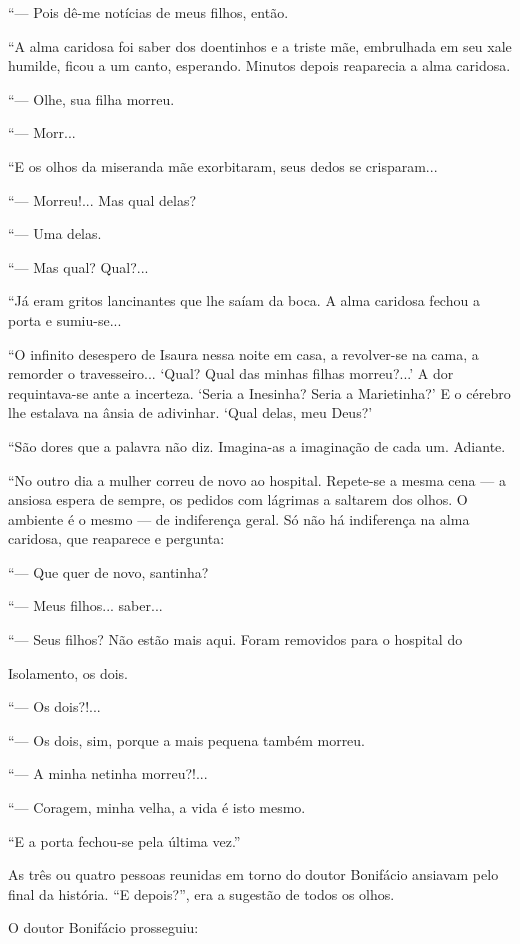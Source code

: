 ``--- Pois dê-me notícias de meus filhos, então.

``A alma caridosa foi saber dos doentinhos e a triste mãe, embrulhada em
seu xale humilde, ficou a um canto, esperando. Minutos depois reaparecia
a alma caridosa.

``--- Olhe, sua filha morreu.

``--- Morr...

``E os olhos da miseranda mãe exorbitaram, seus dedos se crisparam...

``--- Morreu!... Mas qual delas?

``--- Uma delas.

``--- Mas qual? Qual?...

``Já eram gritos lancinantes que lhe saíam da boca. A alma caridosa
fechou a porta e sumiu-se...

``O infinito desespero de Isaura nessa noite em casa, a revolver-se na
cama, a remorder o travesseiro... `Qual? Qual das minhas filhas
morreu?...' A dor requintava-se ante a incerteza. `Seria a Inesinha?
Seria a Marietinha?' E o cérebro lhe estalava na ânsia de adivinhar.
`Qual delas, meu Deus?'

``São dores que a palavra não diz. Imagina-as a imaginação de cada um.
Adiante.

``No outro dia a mulher correu de novo ao hospital. Repete-se a mesma
cena --- a ansiosa espera de sempre, os pedidos com lágrimas a saltarem
dos olhos. O ambiente é o mesmo --- de indiferença geral. Só não há
indiferença na alma caridosa, que reaparece e pergunta:

``--- Que quer de novo, santinha?

``--- Meus filhos... saber...

``--- Seus filhos? Não estão mais aqui. Foram removidos para o hospital
do

Isolamento, os dois.

``--- Os dois?!...

``--- Os dois, sim, porque a mais pequena também morreu.

``--- A minha netinha morreu?!...

``--- Coragem, minha velha, a vida é isto mesmo.

``E a porta fechou-se pela última vez.''

As três ou quatro pessoas reunidas em torno do doutor Bonifácio ansiavam
pelo final da história. ``E depois?'', era a sugestão de todos os olhos.

O doutor Bonifácio prosseguiu:

